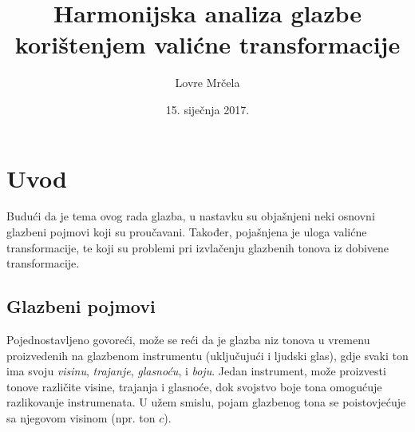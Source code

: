 \documentclass[a4paper, 11pt, twocolumn]{article}
\begin{document}
\date{15. siječnja 2017.}
\title{Harmonijska analiza glazbe korištenjem valićne transformacije} 
\author{Lovre Mrčela}
\maketitle



\section{Uvod}
Budući da je tema ovog rada glazba, u nastavku su objašnjeni neki osnovni glazbeni pojmovi koji su proučavani.
Također, pojašnjena je uloga valićne transformacije, te koji su problemi pri izvlačenju glazbenih tonova iz dobivene transformacije.

\subsection{Glazbeni pojmovi}
Pojednostavljeno govoreći, može se reći da je glazba niz tonova u vremenu proizvedenih na glazbenom instrumentu (uključujući i ljudski glas), gdje svaki ton ima svoju \textit{visinu}, \textit{trajanje}, \textit{glasnoću}, i \textit{boju}.
Jedan instrument, može proizvesti tonove različite visine, trajanja i glasnoće, dok svojstvo boje tona omogućuje razlikovanje instrumenata.
U užem smislu, pojam glazbenog tona se poistovjećuje sa njegovom visinom (npr. ton $c$).
\end{document}
